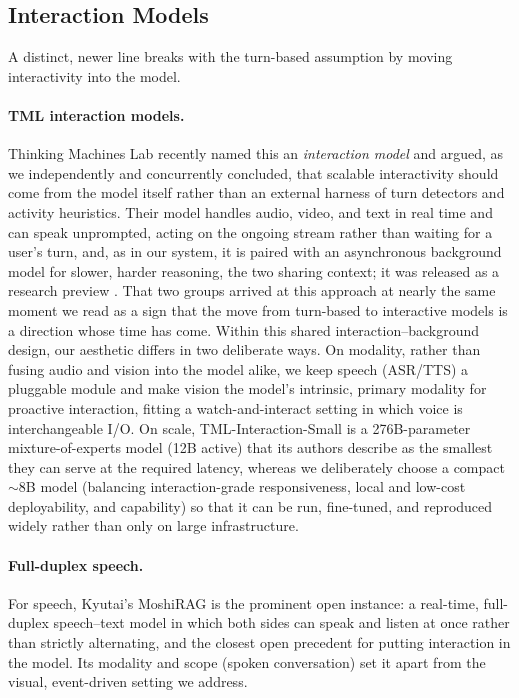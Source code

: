 \subsection{Interaction Models}
A distinct, newer line breaks with the turn-based assumption by moving interactivity into the model.
\paragraph{\textbf{TML interaction models.}} Thinking Machines Lab recently named this an \textit{interaction model} and argued, as we independently and concurrently concluded, that scalable interactivity should come from the model itself rather than an external harness of turn detectors and activity heuristics. Their model handles audio, video, and text in real time and can speak unprompted, acting on the ongoing stream rather than waiting for a user's turn, and, as in our system, it is paired with an asynchronous background model for slower, harder reasoning, the two sharing context; it was released as a research preview \cite{thinkingmachines2026interactionmodels}. That two groups arrived at this approach at nearly the same moment we read as a sign that the move from turn-based to interactive models is a direction whose time has come. Within this shared interaction--background design, our aesthetic differs in two deliberate ways. On modality, rather than fusing audio and vision into the model alike, we keep speech (ASR/TTS) a pluggable module and make vision the model's intrinsic, primary modality for proactive interaction, fitting a watch-and-interact setting in which voice is interchangeable I/O. On scale, TML-Interaction-Small is a 276B-parameter mixture-of-experts model (12B active) that its authors describe as the smallest they can serve at the required latency, whereas we deliberately choose a compact $\sim$8B model (balancing interaction-grade responsiveness, local and low-cost deployability, and capability) so that it can be run, fine-tuned, and reproduced widely rather than only on large infrastructure.
\paragraph{\textbf{Full-duplex speech.}} For speech, Kyutai's MoshiRAG \cite{chien2026moshiragasynchronousknowledgeretrieval} is the prominent open instance: a real-time, full-duplex speech--text model in which both sides can speak and listen at once rather than strictly alternating, and the closest open precedent for putting interaction in the model. Its modality and scope (spoken conversation) set it apart from the visual, event-driven setting we address.


